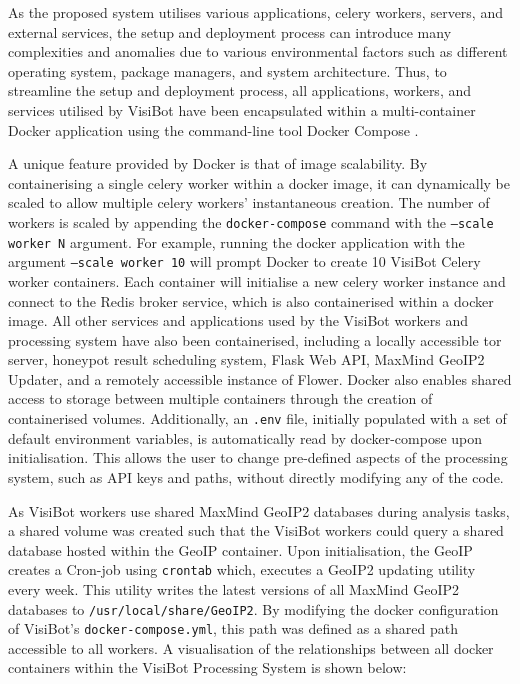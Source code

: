 As the proposed system utilises various applications, celery workers, servers, and external services, the setup and deployment process can introduce many complexities and anomalies due to various environmental factors such as different operating system, package managers, and system architecture. Thus, to streamline the setup and deployment process, all applications, workers, and services utilised by VisiBot have been encapsulated within a multi-container Docker application using the command-line tool Docker Compose \citep{DockerCompose}. 

A unique feature provided by Docker is that of image scalability. By containerising a single celery worker within a docker image, it can dynamically be scaled to allow multiple celery workers' instantaneous creation. The number of workers is scaled by appending the \texttt{docker-compose} command with the \texttt{--scale worker N} argument. For example, running the docker application with the argument \texttt{--scale worker 10} will prompt Docker to create 10 VisiBot Celery worker containers. Each container will initialise a new celery worker instance and connect to the Redis broker service, which is also containerised within a docker image. All other services and applications used by the VisiBot workers and processing system have also been containerised, including a locally accessible tor server, honeypot result scheduling system, Flask Web API, MaxMind GeoIP2 Updater, and a remotely accessible instance of Flower. Docker also enables shared access to storage between multiple containers through the creation of containerised volumes. Additionally, an \texttt{.env} file, initially populated with a set of default environment variables, is automatically read by docker-compose upon initialisation. This allows the user to change pre-defined aspects of the processing system, such as API keys and paths, without directly modifying any of the code.

As VisiBot workers use shared MaxMind GeoIP2 databases \citep{MaxMind} during analysis tasks, a shared volume was created such that the VisiBot workers could query a shared database hosted within the GeoIP container. Upon initialisation, the GeoIP creates a Cron-job using \texttt{crontab} \citep{Crontab} which, executes a GeoIP2 updating utility every week. This utility writes the latest versions of all MaxMind GeoIP2 databases to \texttt{/usr/local/share/GeoIP2}. By modifying the docker configuration of VisiBot's \texttt{docker-compose.yml}, this path was defined as a shared path accessible to all workers. A visualisation of the relationships between all docker containers within the VisiBot Processing System is shown below:


